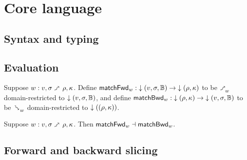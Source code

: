 \section{Core language}

\subsection{Syntax and typing}







\subsection{Evaluation}


\begin{definition}
   Suppose $w: v, \sigma \matchFwd \rho, \kappa$. Define $\mathsf{matchFwd}_{w}: {\downarrow{(v,\sigma,\mathbb{B})}} \to {\downarrow{(\rho,\kappa)}}$ to be $\matchFwdR{w}$ domain-restricted to ${\downarrow{(v,\sigma,\mathbb{B})}}$, and define $\mathsf{matchBwd}_{w}: {\downarrow{(\rho,\kappa)}} \to {\downarrow{(v,\sigma,\mathbb{B})}}$ to be $\matchBwdR{w}$ domain-restricted to ${\downarrow{((\rho,\kappa))}}$.
\end{definition}

\begin{theorem}
\label{thm:core-language:pattern-matching:gc}
   Suppose $w: v, \sigma \matchFwd \rho, \kappa$.  Then $\mathsf{matchFwd}_{w} \dashv \mathsf{matchBwd}_{w}$.
\end{theorem}



\subsection{Forward and backward slicing}









